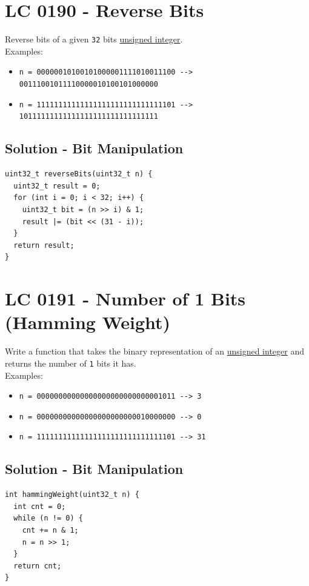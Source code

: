 \section{LC 0190 - Reverse Bits}
Reverse bits of a given {\colorbox{CodeBackground}{\lstinline|32|}} bits \ul{unsigned integer}.\\

Examples:
\begin{itemize}
\item {\colorbox{CodeBackground}{\lstinline|n = 00000010100101000001111010011100 --> 00111001011110000010100101000000|}}
\item {\colorbox{CodeBackground}{\lstinline|n = 11111111111111111111111111111101 --> 10111111111111111111111111111111|}}
\end{itemize}

\subsection*{Solution - Bit Manipulation}
\begin{lstlisting}
uint32_t reverseBits(uint32_t n) {
  uint32_t result = 0;
  for (int i = 0; i < 32; i++) {
    uint32_t bit = (n >> i) & 1;
    result |= (bit << (31 - i));
  }
  return result;
}
\end{lstlisting}

\section{LC 0191 - Number of 1 Bits (Hamming Weight)}
Write a function that takes the binary representation of an \ul{unsigned integer} and returns the number of {\colorbox{CodeBackground}{\lstinline|1|}} bits it has.\\

Examples:
\begin{itemize}
\item {\colorbox{CodeBackground}{\lstinline|n = 00000000000000000000000000001011 --> 3|}}
\item {\colorbox{CodeBackground}{\lstinline|n = 00000000000000000000000010000000 --> 0|}}
\item {\colorbox{CodeBackground}{\lstinline|n = 11111111111111111111111111111101 --> 31|}}
\end{itemize}

\subsection*{Solution - Bit Manipulation}
\begin{lstlisting}
int hammingWeight(uint32_t n) {
  int cnt = 0;
  while (n != 0) {
    cnt += n & 1;
    n = n >> 1;
  }
  return cnt;
}
\end{lstlisting}

